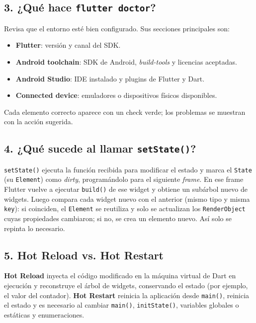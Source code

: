 \documentclass[12pt,a4paper]{article}
\begin{document}
\subsection*{3. ¿Qué hace \texttt{flutter doctor}?}
Revisa que el entorno esté bien configurado. Sus secciones principales son:
\begin{itemize}
  \item \textbf{Flutter}: versión y canal del SDK.
  \item \textbf{Android toolchain}: SDK de Android, \textit{build-tools} y licencias aceptadas.
  \item \textbf{Android Studio}: IDE instalado y plugins de Flutter y Dart.
  \item \textbf{Connected device}: emuladores o dispositivos físicos disponibles.
\end{itemize}
Cada elemento correcto aparece con un check verde; los problemas se muestran con la acción sugerida.

\subsection*{4. ¿Qué sucede al llamar \texttt{setState()}?}
\texttt{setState()} ejecuta la función recibida para modificar el estado y marca el \texttt{State} (su \texttt{Element}) como \textit{dirty}, programándolo para el siguiente \textit{frame}. En ese frame Flutter vuelve a ejecutar \texttt{build()} de ese widget y obtiene un subárbol nuevo de widgets. Luego compara cada widget nuevo con el anterior (mismo tipo y misma \texttt{key}): si coinciden, el \texttt{Element} se reutiliza y solo se actualizan los \texttt{RenderObject} cuyas propiedades cambiaron; si no, se crea un elemento nuevo. Así solo se repinta lo necesario.

\subsection*{5. Hot Reload vs. Hot Restart}
\textbf{Hot Reload} inyecta el código modificado en la máquina virtual de Dart en ejecución y reconstruye el árbol de widgets, conservando el estado (por ejemplo, el valor del contador). \textbf{Hot Restart} reinicia la aplicación desde \texttt{main()}, reinicia el estado y es necesario al cambiar \texttt{main()}, \texttt{initState()}, variables globales o estáticas y enumeraciones.
\end{document}
